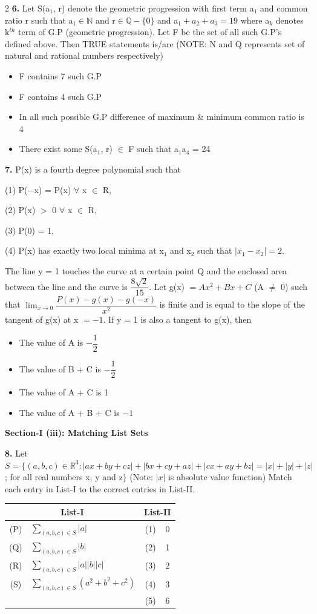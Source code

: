 \documentclass[10pt]{extarticle}
\newenvironment{qoptions}{\begin{itemize}[leftmargin=1.8em,itemsep=2pt,topsep=2pt,label={}]}{\end{itemize}}
\newcommand{\opt}[2]{\item[({#1})] {#2}}
\newcommand{\subsectionhdr}[1]{\par\vspace{3pt}\noindent\textbf{#1}\par\vspace{2pt}}
\begin{document}
\begin{multicols}{2}
\textbf{6.} Let S(a$_1$, r) denote the geometric progression with first term a$_1$ and common ratio r such that a$_1\in\mathbb N$ and r$\in\mathbb Q-\{0\}$ and a$_1+a_2+a_3=19$ where a$_k$ denotes k$^{th}$ term of G.P (geometric progression). Let F be the set of all such G.P's defined above. Then TRUE statements is/are (NOTE: N and Q represents set of natural and rational numbers respectively)

\begin{qoptions}
\opt{A}{F contains 7 such G.P}
\opt{B}{F contains 4 such G.P}
\opt{C}{In all such possible G.P difference of maximum \& minimum common ratio is 4}
\opt{D}{There exist some S(a$_1$, r) $\in$ F such that a$_1$a$_4$ = 24}
\end{qoptions}

\textbf{7.} P(x) is a fourth degree polynomial such that

(1) P($-$x) = P(x) $\forall$ x $\in$ R,

(2) P(x) $>$ 0 $\forall$ x $\in$ R,

(3) P(0) = 1,

(4) P(x) has exactly two local minima at x$_1$ and x$_2$ such that $|x_1-x_2|=2$.

The line y = 1 touches the curve at a certain point Q and the enclosed area between the line and the curve is $\dfrac{8\sqrt2}{15}$. Let g(x) $=Ax^2+Bx+C$ (A $\ne$ 0) such that $\displaystyle\lim_{x\to0}\dfrac{P(x)-g(x)-g(-x)}{x^2}$ is finite and is equal to the slope of the tangent of g(x) at x $=-1$. If y = 1 is also a tangent to g(x), then

\begin{qoptions}
\opt{A}{The value of A is $-\dfrac12$}
\opt{B}{The value of B + C is $-\dfrac12$}
\opt{C}{The value of A + C is 1}
\opt{D}{The value of A + B + C is $-1$}
\end{qoptions}

\subsectionhdr{Section-I (iii): Matching List Sets}

\textbf{8.} Let $S=\{(a,b,c)\in\mathbb R^3:|ax+by+cz|+|bx+cy+az|+|cx+ay+bz|=|x|+|y|+|z|$; for all real numbers x, y and z$\}$ (Note: $|x|$ is absolute value function) Match each entry in List-I to the correct entries in List-II.

\end{multicols}

\begin{center}
\begin{tabular}{|c|l|c|l|}
\hline
\multicolumn{2}{|c|}{\textbf{List-I}} & \multicolumn{2}{c|}{\textbf{List-II}} \\
\hline
(P) & $\displaystyle\sum_{(a,b,c)\in S}|a|$ & (1) & 0 \\[8pt]
\hline
(Q) & $\displaystyle\sum_{(a,b,c)\in S}|b|$ & (2) & 1 \\[8pt]
\hline
(R) & $\displaystyle\sum_{(a,b,c)\in S}|a||b||c|$ & (3) & 2 \\[8pt]
\hline
(S) & $\displaystyle\sum_{(a,b,c)\in S}(a^2+b^2+c^2)$ & (4) & 3 \\[8pt]
\hline
& & (5) & 6 \\
\hline
\end{tabular}
\end{center}
\end{document}
